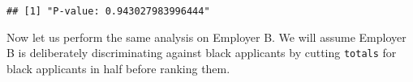 \documentclass[
]{article}
\newenvironment{Shaded}{\begin{snugshade}}{\end{snugshade}}
\newcommand{\AttributeTok}[1]{\textcolor[rgb]{0.77,0.63,0.00}{#1}}
\newcommand{\CommentTok}[1]{\textcolor[rgb]{0.56,0.35,0.01}{\textit{#1}}}
\newcommand{\ConstantTok}[1]{\textcolor[rgb]{0.00,0.00,0.00}{#1}}
\newcommand{\DecValTok}[1]{\textcolor[rgb]{0.00,0.00,0.81}{#1}}
\newcommand{\FunctionTok}[1]{\textcolor[rgb]{0.00,0.00,0.00}{#1}}
\newcommand{\NormalTok}[1]{#1}
\newcommand{\OtherTok}[1]{\textcolor[rgb]{0.56,0.35,0.01}{#1}}
\newcommand{\SpecialCharTok}[1]{\textcolor[rgb]{0.00,0.00,0.00}{#1}}
\newcommand{\StringTok}[1]{\textcolor[rgb]{0.31,0.60,0.02}{#1}}
\begin{document}
\begin{Shaded}
\end{Shaded}

\begin{verbatim}
## [1] "P-value: 0.943027983996444"
\end{verbatim}

Now let us perform the same analysis on Employer B. We will assume
Employer B is deliberately discriminating against black applicants by
cutting \texttt{totals} for black applicants in half before ranking
them.
\end{document}

